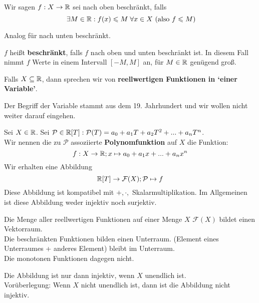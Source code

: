 \documentclass[main.tex]{subfiles}
\begin{document}
\begin{Definition}[Beschränktheit]
  Wir sagen $f:X \to \mathbb{R}$ sei nach oben beschränkt, falls
  $$\;\exists M \in \mathbb{R} : f(x) \leqslant M \;\forall x \in X \text{ (also $f \leqslant M$)}$$

  Analog für nach unten beschränkt.

  $f$ heißt \textbf{beschränkt}, falls $f$ nach oben und unten beschränkt ist. In diesem Fall nimmt $f$ Werte in einem Intervall $[-M,M]$ an, für $M \in \mathbb{R}$ genügend groß.
\end{Definition}

\begin{Definition}
  Falls $X \subseteq \mathbb{R}$, dann sprechen wir von \textbf{reellwertigen Funktionen in `einer Variable'}.
\end{Definition}

\begin{Bemerkung}
  Der Begriff der Variable stammt aus dem 19. Jahrhundert und wir wollen nicht weiter darauf eingehen.
\end{Bemerkung}

\begin{Beispiel}
  \begin{Definition}[Polynomfunktion]
    Sei $X \in \mathbb{R}$. Sei $\mathcal{P} \in \mathbb{R}[T] : \mathcal{P}(T) = a_0 + a_1 T + a_2 T^2 +...+ a_n T^n$.\\
    Wir nennen die zu $\mathcal{P}$ assoziierte \textbf{Polynomfunktion} auf $X$ die Funktion:
    $$f: X \to \mathbb{R} ; x \mapsto a_0 + a_1x + ... + a_n x^n$$
    Wir erhalten eine Abbildung
    $$\mathbb{R}[T] \to \mathcal{F}(X) ; \mathcal{P} \mapsto f$$
    Diese Abbildung ist kompatibel mit $+,\cdot,$ Skalarmultiplikation. Im Allgemeinen ist diese Abbildung weder injektiv noch surjektiv.
  \end{Definition}
  \begin{Bemerkung}
    Die Menge aller reellwertigen Funktionen auf einer Menge $X$ $\mathcal{F}(X)$ bildet einen Vektorraum.\\
    Die beschränkten Funktionen bilden einen Unterraum. (Element eines Unterraumes + anderes Element) bleibt im Unterraum.\\
    Die monotonen Funktionen dagegen nicht.
  \end{Bemerkung}
  \begin{Theorem}
    Die Abbildung ist nur dann injektiv, wenn $X$ unendlich ist.\\
    Vorüberlegung: Wenn $X$ nicht unendlich ist, dann ist die Abbildung nicht injektiv.
  \end{Theorem}
\end{Beispiel}
\end{document}
